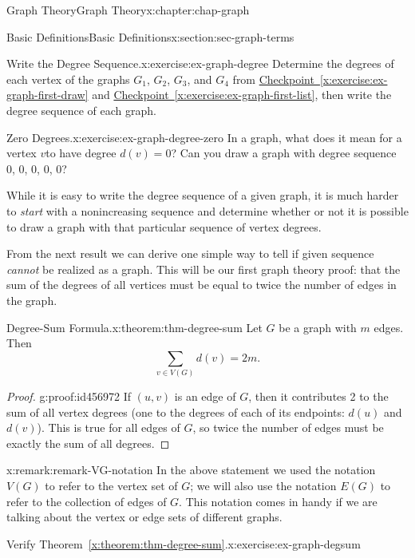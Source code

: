 \documentclass[oneside,10pt,]{book}
\newcommand{\xreffont}{\relax}
\numberwithin{equation}{section}
\begin{document}
\begin{chapterptx}{Graph Theory}{}{Graph Theory}{}{}{x:chapter:chap-graph}
\begin{sectionptx}{Basic Definitions}{}{Basic Definitions}{}{}{x:section:sec-graph-terms}
\begin{inlineexercise}{Write the Degree Sequence.}{x:exercise:ex-graph-degree}
Determine the degrees of each vertex of the graphs \(G_1\), \(G_2\), \(G_3\), and \(G_4\) from \hyperref[x:exercise:ex-graph-first-draw]{Checkpoint~{\xreffont\ref{x:exercise:ex-graph-first-draw}}} and \hyperref[x:exercise:ex-graph-first-list]{Checkpoint~{\xreffont\ref{x:exercise:ex-graph-first-list}}}, then write the degree sequence of each graph.%
\end{inlineexercise}
\begin{inlineexercise}{Zero Degrees.}{x:exercise:ex-graph-degree-zero}%
In a graph, what does it mean for a vertex \(v\)to have degree \(d(v) = 0\)? Can you draw a graph with degree sequence 0, 0, 0, 0, 0?%
\end{inlineexercise}
While it is easy to write the degree sequence of a given graph, it is much harder to \emph{start} with a nonincreasing sequence and determine whether or not it is possible to draw a graph with that particular sequence of vertex degrees.%
\par
From the next result we can derive one simple way to tell if given sequence \emph{cannot} be realized as a graph. This will be our first graph theory proof: that the sum of the degrees of all vertices must be equal to twice the number of edges in the graph.%
\begin{theorem}{Degree-Sum Formula.}{}{x:theorem:thm-degree-sum}%
Let \(G\) be a graph with \(m\) edges. Then%
\begin{equation*}
\sum_{v \in V(G)} d(v) = 2m\text{.}
\end{equation*}
%
\end{theorem}
\begin{proof}{}{g:proof:id456972}
If \((u,v)\) is an edge of \(G\), then it contributes 2 to the sum of all vertex degrees (one to the degrees of each of its endpoints: \(d(u)\) and \(d(v)\)). This is true for all edges of \(G\), so twice the number of edges must be exactly the sum of all degrees.%
\end{proof}
\begin{remark}{}{x:remark:remark-VG-notation}%
In the above statement we used the notation \(V(G)\) to refer to the vertex set of \(G\); we will also use the notation \(E(G)\) to refer to the collection of edges of \(G\). This notation comes in handy if we are talking about the vertex or edge sets of different graphs. \label{g:notation:id457188}\label{g:notation:id457182}%
\end{remark}
\begin{inlineexercise}{Verify Theorem~{\xreffont\ref*{x:theorem:thm-degree-sum}}.}{x:exercise:ex-graph-degsum}%

\end{inlineexercise}
\end{sectionptx}
\end{chapterptx}
\end{document}
